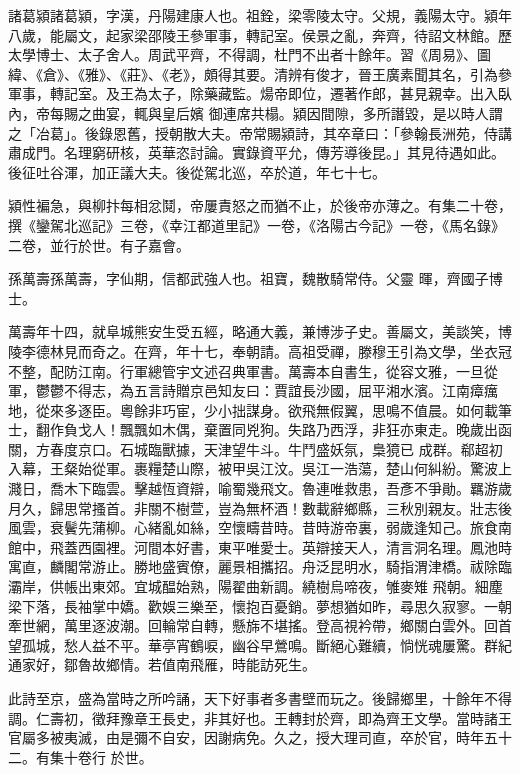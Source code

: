 \begin{pinyinscope}
 諸葛潁諸葛潁，字漢，丹陽建康人也。祖銓，梁零陵太守。父規，義陽太守。潁年八歲，能屬文，起家梁邵陵王參軍事，轉記室。侯景之亂，奔齊，待詔文林館。歷太學博士、太子舍人。周武平齊，不得調，杜門不出者十餘年。習《周易》、圖緯、《倉》、《雅》、《莊》、《老》，頗得其要。清辨有俊才，晉王廣素聞其名，引為參軍事，轉記室。及王為太子，除藥藏監。煬帝即位，遷著作郎，甚見親幸。出入臥內，帝每賜之曲宴，輒與皇后嬪
 御連席共榻。潁因間隙，多所譖毀，是以時人謂之「冶葛」。後錄恩舊，授朝散大夫。帝常賜潁詩，其卒章曰：「參翰長洲苑，侍講肅成門。名理窮研核，英華恣討論。實錄資平允，傳芳導後昆。」其見待遇如此。後征吐谷渾，加正議大夫。後從駕北巡，卒於道，年七十七。



 潁性褊急，與柳抃每相忿鬩，帝屢責怒之而猶不止，於後帝亦薄之。有集二十卷，撰《鑾駕北巡記》三卷，《幸江都道里記》一卷，《洛陽古今記》一卷，《馬名錄》二卷，並行於世。有子嘉會。



 孫萬壽孫萬壽，字仙期，信都武強人也。祖寶，魏散騎常侍。父靈
 暉，齊國子博士。



 萬壽年十四，就阜城熊安生受五經，略通大義，兼博涉子史。善屬文，美談笑，博陵李德林見而奇之。在齊，年十七，奉朝請。高祖受禪，滕穆王引為文學，坐衣冠不整，配防江南。行軍總管宇文述召典軍書。萬壽本自書生，從容文雅，一旦從軍，鬱鬱不得志，為五言詩贈京邑知友曰：賈誼長沙國，屈平湘水濱。江南瘴癘地，從來多逐臣。粵餘非巧宦，少小拙謀身。欲飛無假翼，思鳴不值晨。如何載筆士，翻作負戈人！飄飄如木偶，棄置同兇狗。失路乃西浮，非狂亦東走。晚歲出函關，方春度京口。石城臨獸據，天津望牛斗。牛鬥盛妖氛，梟獍已
 成群。郗超初入幕，王粲始從軍。裹糧楚山際，被甲吳江汶。吳江一浩蕩，楚山何糾紛。驚波上濺日，喬木下臨雲。擊越恆資辯，喻蜀幾飛文。魯連唯救患，吾彥不爭勛。羈游歲月久，歸思常搔首。非關不樹萱，豈為無杯酒！數載辭鄉縣，三秋別親友。壯志後風雲，衰鬢先蒲柳。心緒亂如絲，空懷疇昔時。昔時游帝裏，弱歲逢知己。旅食南館中，飛蓋西園裡。河間本好書，東平唯愛士。英辯接天人，清言洞名理。鳳池時寓直，麟閣常游止。勝地盛賓僚，麗景相攜招。舟泛昆明水，騎指渭津橋。祓除臨灞岸，供帳出東郊。宜城醖始熟，陽翟曲新調。繞樹烏啼夜，雊麥雉
 飛朝。細塵梁下落，長袖掌中嬌。歡娛三樂至，懷抱百憂銷。夢想猶如昨，尋思久寂寥。一朝牽世網，萬里逐波潮。回輪常自轉，懸旆不堪搖。登高視衿帶，鄉關白雲外。回首望孤城，愁人益不平。華亭宵鶴唳，幽谷早鶯鳴。斷絕心難續，惝恍魂屢驚。群紀通家好，鄒魯故鄉情。若值南飛雁，時能訪死生。



 此詩至京，盛為當時之所吟誦，天下好事者多書壁而玩之。後歸鄉里，十餘年不得調。仁壽初，徵拜豫章王長史，非其好也。王轉封於齊，即為齊王文學。當時諸王官屬多被夷滅，由是彌不自安，因謝病免。久之，授大理司直，卒於官，時年五十二。有集十卷行
 於世。




\end{pinyinscope}
